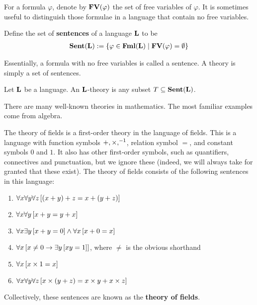For a formula $\varphi$, denote by $\mathbf{FV}\!\left( \varphi \right)$ the set of free variables of $\varphi$. It is sometimes useful to distinguish those formulae in a language that contain no free variables.

\begin{boxdefinition}
    Define the set of \textbf{sentences} of a language $\mathbf{L}$ to be
    \begin{align*}
        \mathbf{Sent}\!\left( \mathbf{L} \right) := \left\{ \varphi \in \mathbf{Fml}\!\left( \mathbf{L} \right) \; \middle\vert \; \mathbf{FV}\!\left( \varphi \right) = \emptyset \right\}
    \end{align*}
\end{boxdefinition}

Essentially, a formula with no free variables is called a sentence. A theory is simply a set of sentences.

\begin{boxdefinition}[Theory]
    Let $\mathbf{L}$ be a language. An $\mathbf{L}$-theory is any subset $T \subseteq \mathbf{Sent}(\mathbf{L})$.
\end{boxdefinition}

There are many well-known theories in mathematics. The most familiar examples come from algebra.

\begin{boxexample}\label{Ch1:Eg:Thy_of_Fields}
    The theory of fields is a first-order theory in the language of fields. This is a language with function symbols $+, \times, ^{-1}$, relation symbol $=$, and constant symbols $0$ and $1$. It also has other first-order symbols, such as quantifiers, connectives and punctuation, but we ignore these (indeed, we will always take for granted that these exist). The theory of fields consists of the following sentences in this language:
    \begin{enumerate}
        \item $\forall x \forall y \forall z \left[ \left( x + y \right) + z = x + \left( y + z \right) \right]$
        \item $\forall x \forall y \left[ x + y = y + x \right]$
        \item $\forall x \exists y \left[ x + y = 0 \right] \land \forall x \left[ x + 0 = x \right]$
        \item $\forall x \left[ x \neq 0 \to \exists y \left[ x y = 1 \right] \right]$, where $\neq$ is the obvious shorthand
        \item $\forall x \left[ x \times 1 = x \right]$
        \item $\forall x \forall y \forall z \left[ x \times \left( y + z \right) = x \times y + x \times z \right]$
    \end{enumerate}
    Collectively, these sentences are known as the \textbf{theory of fields}.
\end{boxexample}

